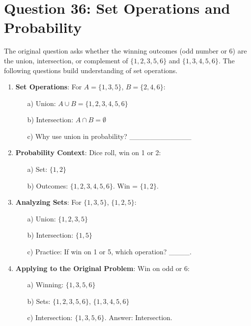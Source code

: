 \documentclass[12pt]{article}
\begin{document}
\section*{Question 36: Set Operations and Probability}
The original question asks whether the winning outcomes (odd number or 6) are the union, intersection, or complement of \( \{1, 2, 3, 5, 6\} \) and \( \{1, 3, 4, 5, 6\} \). The following questions build understanding of set operations.

\begin{enumerate}[label=36.\arabic*]
    \item \textbf{Set Operations}: For \( A = \{1, 3, 5\} \), \( B = \{2, 4, 6\} \):
    \begin{enumerate}
        \item[a)] Union: \( A \cup B = \{1, 2, 3, 4, 5, 6\} \)
        \item[b)] Intersection: \( A \cap B = \emptyset \)
        \item[c)] Why use union in probability? \_\_\_\_\_\_\_\_\_\_\_\_
    \end{enumerate}
    \item \textbf{Probability Context}: Dice roll, win on 1 or 2:
    \begin{enumerate}
        \item[a)] Set: \( \{1, 2\} \)
        \item[b)] Outcomes: \( \{1, 2, 3, 4, 5, 6\} \). Win = \( \{1, 2\} \).
    \end{enumerate}
    \item \textbf{Analyzing Sets}: For \( \{1, 3, 5\} \), \( \{1, 2, 5\} \):
    \begin{enumerate}
        \item[a)] Union: \( \{1, 2, 3, 5\} \)
        \item[b)] Intersection: \( \{1, 5\} \)
        \item[c)] Practice: If win on 1 or 5, which operation? \_\_\_\_.
    \end{enumerate}
    \item \textbf{Applying to the Original Problem}: Win on odd or 6:
    \begin{enumerate}
        \item[a)] Winning: \( \{1, 3, 5, 6\} \)
        \item[b)] Sets: \( \{1, 2, 3, 5, 6\} \), \( \{1, 3, 4, 5, 6\} \)
        \item[c)] Intersection: \( \{1, 3, 5, 6\} \). Answer: Intersection.
    \end{enumerate}
\end{enumerate}
\end{document}
